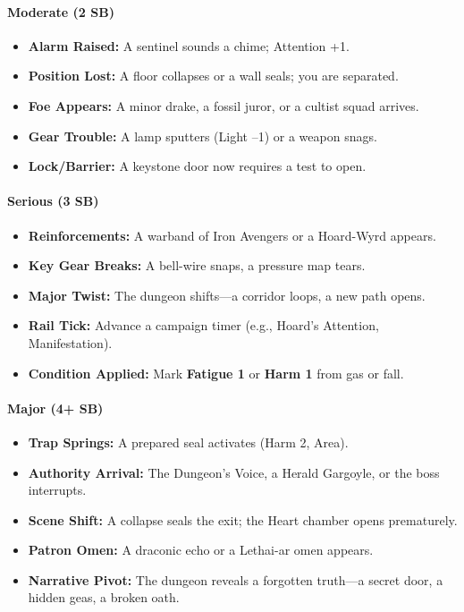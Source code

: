 \paragraph{Moderate (2 SB)}
\begin{itemize}
    \item \textbf{Alarm Raised:} A sentinel sounds a chime; Attention +1.
    \item \textbf{Position Lost:} A floor collapses or a wall seals; you are separated.
    \item \textbf{Foe Appears:} A minor drake, a fossil juror, or a cultist squad arrives.
    \item \textbf{Gear Trouble:} A lamp sputters (Light --1) or a weapon snags.
    \item \textbf{Lock/Barrier:} A keystone door now requires a test to open.
\end{itemize}

\paragraph{Serious (3 SB)}
\begin{itemize}
    \item \textbf{Reinforcements:} A warband of Iron Avengers or a Hoard-Wyrd appears.
    \item \textbf{Key Gear Breaks:} A bell-wire snaps, a pressure map tears.
    \item \textbf{Major Twist:} The dungeon shifts---a corridor loops, a new path opens.
    \item \textbf{Rail Tick:} Advance a campaign timer (e.g., Hoard's Attention, Manifestation).
    \item \textbf{Condition Applied:} Mark \textbf{Fatigue 1} or \textbf{Harm 1} from gas or fall.
\end{itemize}

\paragraph{Major (4+ SB)}
\begin{itemize}
    \item \textbf{Trap Springs:} A prepared seal activates (Harm 2, Area).
    \item \textbf{Authority Arrival:} The Dungeon's Voice, a Herald Gargoyle, or the boss interrupts.
    \item \textbf{Scene Shift:} A collapse seals the exit; the Heart chamber opens prematurely.
    \item \textbf{Patron Omen:} A draconic echo or a Lethai-ar omen appears.
    \item \textbf{Narrative Pivot:} The dungeon reveals a forgotten truth---a secret door, a hidden geas, a broken oath.
\end{itemize}

